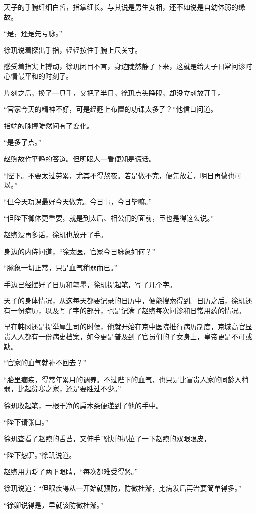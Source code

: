天子的手腕纤细白皙，指掌细长。与其说是男生女相，还不如说是自幼体弱的缘故。

“是，还是先号脉。”

徐玑说着探出手指，轻轻按住手腕上尺关寸。

感受着指尖上搏动，徐玑闭目不言，身边陡然静了下来，这就是给天子日常问诊时心情最平和的时刻了。

片刻之后，换了一只手，又把了半日，徐玑点头睁眼，却没立刻放开手。

“官家今天的精神不好，可是经筵上布置的功课太多了？”他信口问道。

指端的脉搏陡然间有了变化。

“是多了点。”

赵煦故作平静的答道。但明眼人一看便知是谎话。

“陛下。不要太过劳累，尤其不得熬夜。若是做不完，便先放着，明日再做也可以。”

“但今天功课最好今天做完。今日事，今日毕嘛。”

“但陛下御体更重要。就是到太后、相公们的面前，臣也是得这么说。”

赵煦没再多话，徐玑也放开了手。

身边的内侍问道，“徐太医，官家今日脉象如何？”

“脉象一切正常，只是血气稍弱而已。”

手边已经摆好了日历和笔墨，徐玑提起笔，写了几个字。

天子的身体情况，从这每天都要记录的日历中，便能搜索得到。日历之后，徐玑还有一份病历，以及写了字的部分，也是记满了赵煦每次问诊和日常用药的情况。

早在韩冈还是提举厚生司的时候，他就开始在京中医院推行病历制度，京城高官显贵人人都有一份病史档案，如今更是普及到了官员们的子女身上，皇帝更是不可或缺。

“官家的血气就补不回去？”

“胎里痼疾，得常年累月的调养。不过陛下的血气，也只是比富贵人家的同龄人稍弱，比起贫寒之家，还是要胜过不少。”

徐玑收起笔，一根干净的扁木条便递到了他的手中。

“陛下请张口。”

徐玑查看了赵煦的舌苔，又伸手飞快的扒拉了一下赵煦的双眼眼皮，

“陛下恕罪。”徐玑说道。

赵煦用力眨了两下眼睛，“每次都难受得紧。”

徐玑说道：“但眼疾得从一开始就预防，防微杜渐，比病发后再治要简单得多。”

“徐卿说得是，早就该防微杜渐。”

